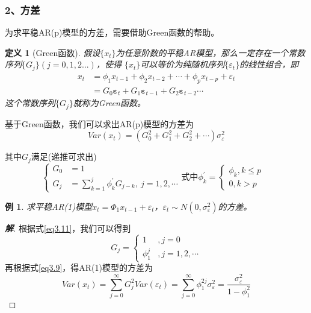 \documentclass[12pt, a4paper, oneside]{ctexbook}
\newtheorem{definition}[theorem]{定义}
\newtheorem{example}[theorem]{例}
\newcommand\jie[2]{\begin{proof}[\textbf{#1}]
    #2
\end{proof}}
\begin{document}
\subsubsection{2、方差}
为求平稳AR(p)模型的方差，需要借助Green函数的帮助。
\begin{definition}[Green函数]
    假设$\{x_t\}$为任意阶数的平稳AR模型，那么一定存在一个常数序列$\{G_j\}(j=0,1,2...)$，使得
    $\{x_t\}$可以等价为纯随机序列$\{\varepsilon_t\}$的线性组合，即
    \begin{equation}\label{eq3.9}
        \begin{aligned}
            {x}_{t}
             & =\phi_1x_{t-1}+\phi_2x_{t-2}+\cdots+\phi_px_{t-p}+\varepsilon_t                                          \\
             & =G_0\boldsymbol{\varepsilon}_t+G_1\boldsymbol{\varepsilon}_{t-1}+G_2\boldsymbol{\varepsilon}_{t-2}\cdots
        \end{aligned}
    \end{equation}
    这个常数序列$\{G_j\}$就称为Green函数。
\end{definition}

基于Green函数，我们可以求出AR(p)模型的方差为
\begin{equation}
    Var(x_t)=\left(G_0^2+G_1^2+G_2^2+\cdots\right)\sigma_\varepsilon^2
\end{equation}

其中$G_j$满足(递推可求出)
\begin{equation}\label{eq3.11}
    \left.\left\{\begin{aligned}
        G_0 & =1                                                \\
        G_j & =\sum_{k=1}^j\phi_k^{\prime}G_{j-k},~j=1,2,\cdots
    \end{aligned}
    \right.\right.\text{式中}\phi_k^{\prime}=
    \begin{cases}\phi_k,k\leq p \\
        0,k>p &\end{cases}
\end{equation}

\begin{example}\label{ex3.2.3}
    求平稳AR(1)模型$x_t=\varPhi_1x_{t-1}+\varepsilon_t$，$\varepsilon_t\sim
        N(0,\sigma_{\varepsilon}^2)$的方差。
\end{example}
\jie{解}{
    根据式\ref{eq3.11}，我们可以得到
    \begin{equation*}
        G_j=\begin{cases}
            1        & ,j=0          \\
            \phi_1^j & ,j=1,2,\cdots
        \end{cases}
    \end{equation*}
    再根据式\ref{eq3.9}，得AR(1)模型的方差为
    \begin{equation*}
        Var(x_{t})=\sum_{j=0}^{\infty}G_{j}^{2}Var(\varepsilon_{t})
        =\sum_{j=0}^{\infty}\phi_{1}^{2j}\sigma_{\varepsilon}^{2}
        =\frac{\sigma_{\varepsilon}^{2}}{1-\phi_{1}^{2}}
    \end{equation*}
}
\end{document}
